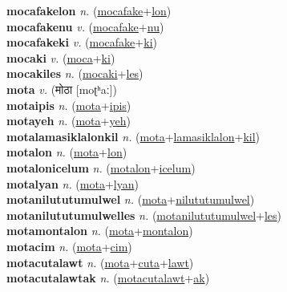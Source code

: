 \textbf{mocafakelon} \textit{n.} (\hyperref[mocafake]{mocafake}+\hyperref[lon]{lon})
 \label{mocafakelon} \\
\textbf{mocafakenu} \textit{v.} (\hyperref[mocafake]{mocafake}+\hyperref[nu]{nu})
 \label{mocafakenu} \\
\textbf{mocafakeki} \textit{v.} (\hyperref[mocafake]{mocafake}+\hyperref[ki]{ki})
 \label{mocafakeki} \\
\textbf{mocaki} \textit{v.} (\hyperref[moca]{moca}+\hyperref[ki]{ki})
 \label{mocaki} \\
\textbf{mocakiles} \textit{n.} (\hyperref[mocaki]{mocaki}+\hyperref[les]{les})
 \label{mocakiles} \\
\textbf{mota} \textit{v.} ({\devanagari{}मोठा} [moʈʰaː])
 \label{mota} \\
\textbf{motaipis} \textit{n.} (\hyperref[mota]{mota}+\hyperref[ipis]{ipis})
 \label{motaipis} \\
\textbf{motayeh} \textit{n.} (\hyperref[mota]{mota}+\hyperref[yeh]{yeh})
 \label{motayeh} \\
\textbf{motalamasiklalonkil} \textit{n.} (\hyperref[mota]{mota}+\hyperref[lamasiklalon]{lamasiklalon}+\hyperref[kil]{kil})
 \label{motalamasiklalonkil} \\
\textbf{motalon} \textit{n.} (\hyperref[mota]{mota}+\hyperref[lon]{lon})
 \label{motalon} \\
\textbf{motalonicelum} \textit{n.} (\hyperref[motalon]{motalon}+\hyperref[icelum]{icelum})
 \label{motalonicelum} \\
\textbf{motalyan} \textit{n.} (\hyperref[mota]{mota}+\hyperref[lyan]{lyan})
 \label{motalyan} \\
\textbf{motanilututumulwel} \textit{n.} (\hyperref[mota]{mota}+\hyperref[nilututumulwel]{nilututumulwel})
 \label{motanilututumulwel} \\
\textbf{motanilututumulwelles} \textit{n.} (\hyperref[motanilututumulwel]{motanilututumulwel}+\hyperref[les]{les})
 \label{motanilututumulwelles} \\
\textbf{motamontalon} \textit{n.} (\hyperref[mota]{mota}+\hyperref[montalon]{montalon})
 \label{motamontalon} \\
\textbf{motacim} \textit{n.} (\hyperref[mota]{mota}+\hyperref[cim]{cim})
 \label{motacim} \\
\textbf{motacutalawt} \textit{n.} (\hyperref[mota]{mota}+\hyperref[cuta]{cuta}+\hyperref[lawt]{lawt})
 \label{motacutalawt} \\
\textbf{motacutalawtak} \textit{n.} (\hyperref[motacutalawt]{motacutalawt}+\hyperref[ak]{ak})
